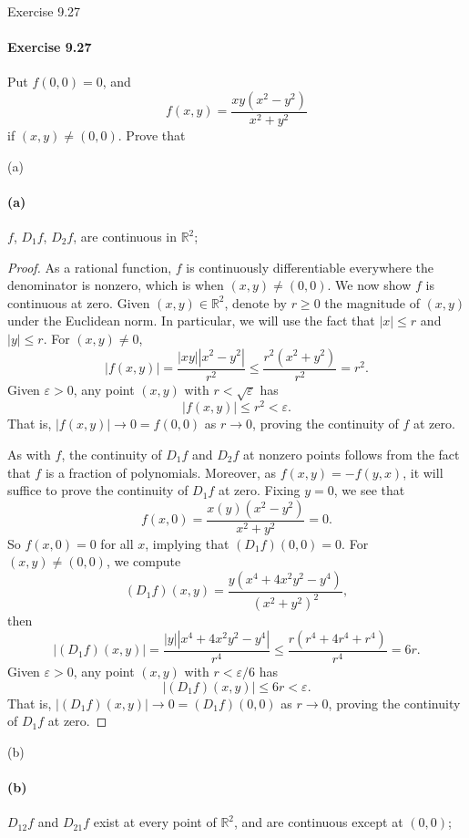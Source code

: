 \documentclass[12pt]{article}
\newenvironment{fullbox}{\begin{lrbox}{\savefullbox}\begin{minipage}{\dimexpr\textwidth-2\fboxsep\relax}}{\end{minipage}\end{lrbox}\begin{center}\framebox[\textwidth]{\usebox{\savefullbox}}\end{center}}
\newenvironment{pbox}[1][]{\begin{fullbox}\ifx#1\empty\else\paragraph{#1}\fi}{\end{fullbox}}
\theoremstyle{definition}
\newcommand{\R}{\mathbb{R}}
\newcommand{\eps}{\varepsilon}
\begin{document}
\newpage
\begin{pbox}[Exercise 9.27]
    Put $f(0, 0) = 0$, and
    \[
        f(x, y) = \frac{xy(x^2 - y^2)}{x^2 + y^2}
    \]
    if $(x, y) \ne (0, 0)$. Prove that
\end{pbox}

\begin{pbox}[(a)]
    $f$, $D_1f$, $D_2f$, are continuous in $\R^2$;
\end{pbox}

\begin{proof}
    As a rational function, $f$ is continuously differentiable everywhere the denominator is nonzero, which is when $(x, y) \ne (0, 0)$. We now show $f$ is continuous at zero. Given $(x, y) \in \R^2$, denote by $r \geq 0$ the magnitude of $(x, y)$ under the Euclidean norm. In particular, we will use the fact that $|x| \leq r$ and $|y| \leq r$. For $(x, y) \ne 0$,
    \[
        |f(x, y)|
            = \frac{|xy||x^2 - y^2|}{r^2}
            \leq \frac{r^2(x^2 + y^2)}{r^2}
            = r^2.
    \]
    Given $\eps > 0$, any point $(x, y)$ with $r < \sqrt{\eps}$ has
    \[
        |f(x, y)| \leq r^2 < \eps.
    \]
    That is, $|f(x, y)| \to 0 = f(0, 0)$ as $r \to 0$, proving the continuity of $f$ at zero.

    As with $f$, the continuity of $D_1f$ and $D_2f$ at nonzero points follows from the fact that $f$ is a fraction of polynomials. Moreover, as $f(x, y) = -f(y, x)$, it will suffice to prove the continuity of $D_1f$ at zero. Fixing $y = 0$, we see that
    \[
        f(x, 0) = \frac{x(y)(x^2 - y^2)}{x^2 + y^2} = 0.
    \]
    So $f(x, 0) = 0$ for all $x$, implying that $(D_1f)(0, 0) = 0$. For $(x, y) \ne (0, 0)$, we compute
    \[
        (D_1f)(x, y) = \frac{y(x^4 + 4x^2y^2 - y^4)}{(x^2 + y^2)^2},
    \]
    then
    \[
        |(D_1f)(x, y)|
            = \frac{|y||x^4 + 4x^2y^2 - y^4|}{r^4}
            \leq \frac{r(r^4 + 4r^4 + r^4)}{r^4}
            = 6r.
    \]
    Given $\eps > 0$, any point $(x, y)$ with $r < \eps/6$ has
    \[
        |(D_1f)(x, y)| \leq 6r < \eps.
    \]
    That is, $|(D_1f)(x, y)| \to 0 = (D_1f)(0, 0)$ as $r \to 0$, proving the continuity of $D_1f$ at zero.

\end{proof}


\newpage
\begin{pbox}[(b)]
    $D_{12}f$ and $D_{21}f$ exist at every point of $\R^2$, and are continuous except at $(0, 0)$;
\end{pbox}
\end{document}

